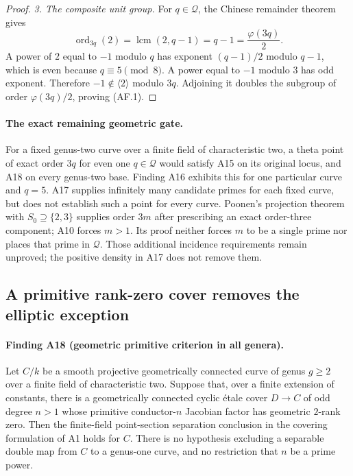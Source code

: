 \documentclass[11pt,a4paper]{article}
\begin{document}
\begin{proof}
\emph{3. The composite unit group.}
For $q\in\mathcal Q$, the Chinese remainder theorem gives
\[
 \operatorname{ord}_{3q}(2)
       =\operatorname{lcm}(2,q-1)=q-1=\frac{\varphi(3q)}2.
\]
A power of $2$ equal to $-1$ modulo $q$ has exponent
$(q-1)/2$ modulo $q-1$, which is even because $q\equiv5\pmod8$.
A power equal to $-1$ modulo $3$ has odd exponent. Therefore
$-1\notin\langle2\rangle$ modulo $3q$. Adjoining it doubles
the subgroup of order $\varphi(3q)/2$, proving (AF.1).
\end{proof}

\paragraph{The exact remaining geometric gate.}
For a fixed genus-two curve over a finite field of
characteristic two, a theta point of exact order $3q$ for even one
$q\in\mathcal Q$ would satisfy A15 on its original locus, and
A18 on every genus-two base. Finding A16 exhibits this for
one particular curve and $q=5$. A17 supplies infinitely many
candidate primes for each fixed curve, but does not establish
such a point for every curve. Poonen's projection theorem with
$S_0\supseteq\{2,3\}$ supplies order $3m$ after prescribing an
exact order-three component; A10 forces $m>1$. Its proof neither
forces $m$ to be a single prime nor places that prime in
$\mathcal Q$. Those additional incidence requirements remain
unproved; the positive density in A17 does not remove them.


\subsection{A primitive rank-zero cover removes the elliptic exception}
\label{sec:geometric-primitive-all-genera}

\paragraph{Finding A18 (geometric primitive criterion in all genera).}
Let $C/k$ be a smooth projective geometrically connected curve of
genus $g\ge2$ over a finite field of characteristic two.
Suppose that, over a finite extension of constants, there is a
geometrically connected cyclic \'etale cover $D\to C$ of odd degree
$n>1$ whose primitive conductor-$n$ Jacobian factor has geometric
$2$-rank zero.  Then the finite-field point-section separation
conclusion in the covering formulation of A1 holds for $C$.
There is no hypothesis excluding a separable double map from $C$
to a genus-one curve, and no restriction that $n$ be a prime power.
\end{document}
